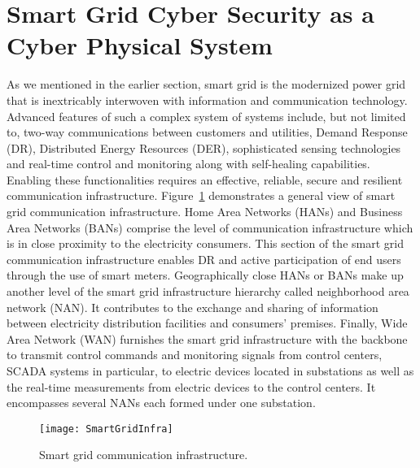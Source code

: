 \documentclass[preprint,number,12pt]{elsarticle}
\begin{document}
\section{Smart Grid Cyber Security as a Cyber Physical System}
\label{sec: smart grid cyber security}
As we mentioned in the earlier section, smart grid is the modernized power grid that is inextricably interwoven with information and communication technology. Advanced features of such a complex system of systems include, but not limited to, two-way communications between customers and utilities, Demand Response (DR), Distributed Energy Resources (DER), sophisticated sensing technologies and real-time control and monitoring\citep{Fan2012} along with self-healing capabilities. Enabling these functionalities requires an effective, reliable, secure and resilient communication infrastructure\citep{Li2012}. Figure~\ref{fig:SmartGridInfra} demonstrates a general view of smart grid communication infrastructure. Home Area Networks (HANs) and Business Area Networks (BANs) comprise the level of communication infrastructure which is in close proximity to the electricity consumers. This section of the smart grid communication infrastructure enables DR and active participation of end users through the use of smart meters. Geographically close HANs or BANs make up another level of the smart grid infrastructure hierarchy called neighborhood area network (NAN). It contributes to the exchange and sharing of information between electricity distribution facilities and consumers' premises. Finally, Wide Area Network (WAN) furnishes the smart grid infrastructure with the backbone to transmit control commands and monitoring signals from control centers, SCADA systems in particular, to electric devices located in substations as well as the real-time measurements from electric devices to the control centers. It encompasses several NANs each formed under one substation\citep{Wang20113604}.
\captionsetup[figure]{labelsep=period}
\captionsetup[table]{labelsep=period}
\begin{figure}[!t]
\centering
\texttt{[image: SmartGridInfra]}
\caption{Smart grid communication infrastructure.}
\label{fig:SmartGridInfra}
\end{figure}
\end{document}
